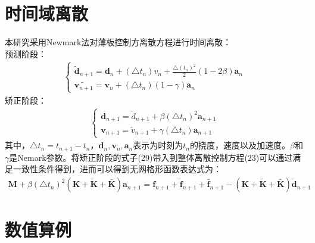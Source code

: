 \documentclass[a4paper]{article}
\begin{document}
\section{时间域离散}
本研究采用Newmark法对薄板控制方离散方程进行时间离散：\\
预测阶段：
\begin{equation}
\begin{split}
    \begin{cases}
        \tilde{\pmb{d}}_{n+1}=\pmb{d}_n+(\triangle t_n)v_n+\frac{\triangle (t_n)^2}{2}(1-2\beta)\pmb a_n\\
        \tilde{\pmb v_{n+1}}=\pmb{v}_n+(\triangle t_n)(1-\gamma)\pmb{a}_n
    \end{cases}
\end{split}
\end{equation}
矫正阶段：
\begin{equation}
\begin{split}
    \begin{cases}
    \pmb{d}_{n+1}=\tilde{d}_{n+1}+\beta(\triangle t_n)^2\pmb a_{n+1}\\
    \pmb v_{n+1}=\tilde{v}_{n+1}+\gamma(\triangle t_n)\pmb{a}_{n+1}
    \end{cases}
\end{split}
\end{equation}
其中，$\triangle t_n=t_{n+1}-t_n$，$\pmb{d}_n,\pmb{v}_n,\pmb a_n$表示为时刻为$t_n$的挠度，速度以及加速度。$\beta$和$\gamma$是Nemark参数。将矫正阶段的式子(29)带入到整体离散控制方程(23)可以通过满足一致性条件得到，进而可以得到无网格形函数表达式为：
\begin{equation}
\begin{split}
\pmb{M}+\beta(\triangle t_n)^2(\pmb{K}+\pmb{\tilde{K}}+\pmb{\bar{K}})\pmb{a}_{n+1}=\pmb{f}_{n+1}+\tilde{\pmb{f}}_{n+1}+\bar{\pmb{f}}_{n+1}-(\pmb{K}+\pmb{\tilde{K}}+\pmb{\bar{K}})\pmb{\tilde{d}}_{n+1}
\end{split}
\end{equation}
\section{数值算例}
\end{document}
